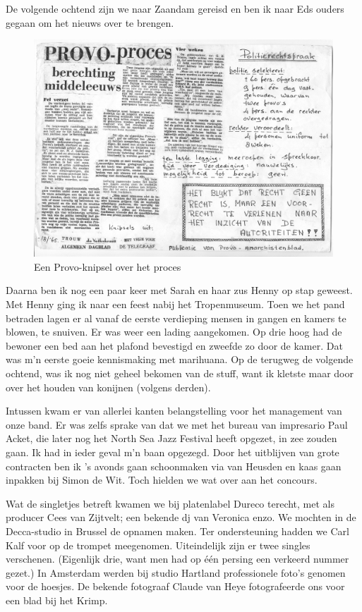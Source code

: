 \documentclass[12pt,twoside, openright]{memoir}
\begin{document}
De volgende ochtend zijn we naar Zaandam gereisd en ben ik naar Eds ouders gegaan om het nieuws over te brengen. 

\begin{figure}
\centering
\includegraphics[width=\textwidth]{img/153aug65EdE2}
\caption*{\footnotesize Een Provo-knipsel over het proces}
\end{figure}

Daarna ben ik nog een paar keer met Sarah en haar zus Henny op stap geweest. Met Henny ging ik naar een feest nabij het Tropenmuseum. Toen we het pand betraden lagen er al vanaf de eerste verdieping mensen in gangen en kamers te blowen, te snuiven. Er was weer een lading aangekomen. Op drie hoog had de bewoner een bed aan het plafond bevestigd en zweefde zo door de kamer. Dat was m’n eerste goeie kennismaking met marihuana. Op de terugweg de volgende ochtend, was ik nog niet geheel bekomen van de stuff, want ik kletste maar door over het houden van konijnen (volgens derden).

Intussen kwam er van allerlei kanten belangstelling voor het management van onze band. Er was zelfs sprake van dat we met het bureau van impresario Paul Acket, die later nog het North Sea Jazz Festival heeft opgezet, in zee zouden gaan. Ik had in ieder geval m’n baan opgezegd. Door het uitblijven van grote contracten ben ik ’s avonds gaan schoonmaken via van Heusden en kaas gaan inpakken bij Simon de Wit. Toch hielden we wat over aan het concours.

Wat de singletjes betreft kwamen we bij platenlabel Dureco terecht, met als producer Cees van Zijtvelt; een bekende dj van Veronica enzo. We mochten in de Decca-studio in Brussel de opnamen maken. Ter ondersteuning hadden we Carl Kalf voor op de trompet meegenomen. Uiteindelijk zijn er twee singles verschenen. (Eigenlijk drie, want men had op één persing een verkeerd nummer gezet.) In Amsterdam werden bij studio Hartland professionele foto’s genomen voor de hoesjes. De bekende fotograaf Claude van Heye fotografeerde ons voor een blad bij het Krimp.
\end{document}
